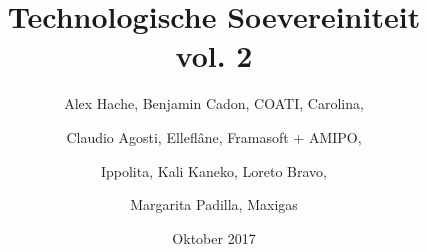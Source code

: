 \title{Technologische Soevereiniteit\\ vol. 2}
\author{
	Alex Hache, Benjamin Cadon, COATI, Carolina, \and 
	Claudio Agosti, Elleflâne, Framasoft + AMIPO, \and
	Ippolita, Kali Kaneko, Loreto Bravo,\and
	Margarita Padilla, Maxigas } 
\date{Oktober 2017}
